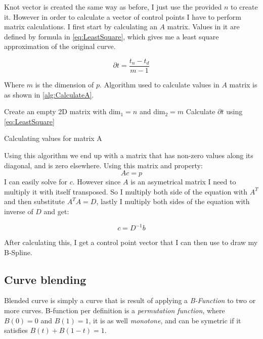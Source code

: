 \documentclass[a4paper,12pt]{extarticle}
\begin{document}
Knot vector is created the same way as before, I just use the provided $n$ to create it. However in order to calculate a vector of control points I have to perform matrix calculations. I first start by calculating an $A$ matrix. Values in it are defined by formula in \cref{eq:LeastSquare}, which gives me a least square approximation of the original curve.

\begin{equation}
\partial t = \frac{t_n - t_d}{m-1}
\label{eq:LeastSquare}
\end{equation}

Where $m$ is the dimension of $p$. Algorithm used to calculate values in $A$ matrix is as shown in \cref{alg:CalculateA}.

\begin{algorithm}
  Create an empty 2D matrix with $\text{dim}_1 = n$ and $\text{dim}_2 = m$\;
  Calculate $\partial t$ using \eqref{eq:LeastSquare}\;
  \caption{Calculating values for matrix A}
  \label{alg:CalculateA}
\end{algorithm}

Using this algorithm we end up with a matrix that has non-zero values along its diagonal, and is zero elsewhere. Using this matrix and property: $$Ac = p$$ I can easily solve for $c$. However since $A$ is an asymetrical matrix I need to multiply it with itself transposed. So I multiply both side of the equation with $A^T$ and then substitute $A^TA=D$, lastly I multiply both sides of the equation with inverse of $D$ and get:

\begin{equation}
c=D^{-1}b
\end{equation}

After calculating this, I get a control point vector that I can then use to draw my B-Spline.

\subsection{Curve blending}
Blended curve is simply a curve that is result of applying a \emph{B-Function} to two or more curves. B-function per definition is a \emph{permutation function}, where $B(0)=0$ and $B(1)=1$, it is as well \emph{monotone}, and can be symetric if it satisfies $B(t)+B(1-t)=1$. \citep[Chap 6.1]{Laksa2012}
\end{document}
